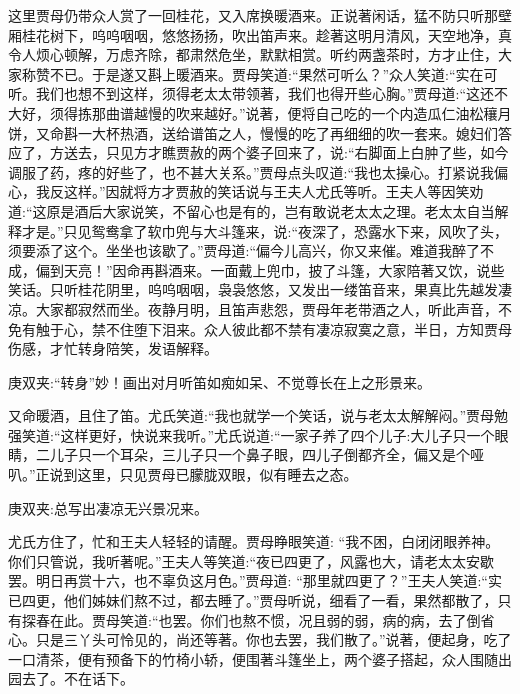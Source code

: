 \begin{parag}
    这里贾母仍带众人赏了一回桂花，又入席换暖酒来。正说著闲话，猛不防只听那壁厢桂花树下，呜呜咽咽，悠悠扬扬，吹出笛声来。趁著这明月清风，天空地净，真令人烦心顿解，万虑齐除，都肃然危坐，默默相赏。听约两盏茶时，方才止住，大家称赞不已。于是遂又斟上暖酒来。贾母笑道:“果然可听么？”众人笑道:“实在可听。我们也想不到这样，须得老太太带领著，我们也得开些心胸。”贾母道:“这还不大好，须得拣那曲谱越慢的吹来越好。”说著，便将自己吃的一个内造瓜仁油松穰月饼，又命斟一大杯热酒，送给谱笛之人，慢慢的吃了再细细的吹一套来。媳妇们答应了，方送去，只见方才瞧贾赦的两个婆子回来了，说:“右脚面上白肿了些，如今调服了药，疼的好些了，也不甚大关系。”贾母点头叹道:“我也太操心。打紧说我偏心，我反这样。”因就将方才贾赦的笑话说与王夫人尤氏等听。王夫人等因笑劝道:“这原是酒后大家说笑，不留心也是有的，岂有敢说老太太之理。老太太自当解释才是。”只见鸳鸯拿了软巾兜与大斗篷来，说:“夜深了，恐露水下来，风吹了头，须要添了这个。坐坐也该歇了。”贾母道:“偏今儿高兴，你又来催。难道我醉了不成，偏到天亮！”因命再斟酒来。一面戴上兜巾，披了斗篷，大家陪著又饮，说些笑话。只听桂花阴里，呜呜咽咽，袅袅悠悠，又发出一缕笛音来，果真比先越发凄凉。大家都寂然而坐。夜静月明，且笛声悲怨，贾母年老带酒之人，听此声音，不免有触于心，禁不住堕下泪来。众人彼此都不禁有凄凉寂寞之意，半日，方知贾母伤感，才忙转身陪笑，发语解释。\begin{note}庚双夹:“转身”妙！画出对月听笛如痴如呆、不觉尊长在上之形景来。\end{note}又命暖酒，且住了笛。尤氏笑道:“我也就学一个笑话，说与老太太解解闷。”贾母勉强笑道:“这样更好，快说来我听。”尤氏说道:“一家子养了四个儿子:大儿子只一个眼睛，二儿子只一个耳朵，三儿子只一个鼻子眼，四儿子倒都齐全，偏又是个哑叭。”正说到这里，只见贾母已朦胧双眼，似有睡去之态。\begin{note}庚双夹:总写出凄凉无兴景况来。\end{note}尤氏方住了，忙和王夫人轻轻的请醒。贾母睁眼笑道: “我不困，白闭闭眼养神。你们只管说，我听著呢。”王夫人等笑道:“夜已四更了，风露也大，请老太太安歇罢。明日再赏十六，也不辜负这月色。”贾母道: “那里就四更了？”王夫人笑道:“实已四更，他们姊妹们熬不过，都去睡了。”贾母听说，细看了一看，果然都散了，只有探春在此。贾母笑道:“也罢。你们也熬不惯，况且弱的弱，病的病，去了倒省心。只是三丫头可怜见的，尚还等著。你也去罢，我们散了。”说著，便起身，吃了一口清茶，便有预备下的竹椅小轿，便围著斗篷坐上，两个婆子搭起，众人围随出园去了。不在话下。
\end{parag}


